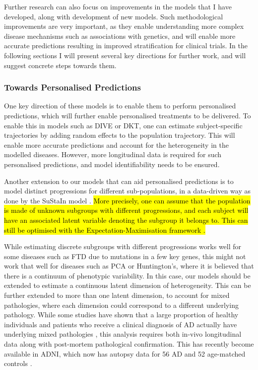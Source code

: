 Further research can also focus on improvements in the models that I have developed, along with development of new models. Such methodological improvements are very important, as they enable understanding more complex disease mechanisms such as associations with genetics, and will enable more accurate predictions resulting in improved stratification for clinical trials. In the following sections I will present several key directions for further work, and will suggest concrete steps towards them.

\subsubsection{Towards Personalised Predictions}
\label{sec:conMetPer}
One key direction of these models is to enable them to perform personalised predictions, which will further enable personalised treatments to be delivered. To enable this in models such as DIVE or DKT, one can estimate subject-specific trajectories by adding random effects to the population trajectory. This will enable more accurate predictions and account for the heterogeneity in the modelled diseases. However, more longitudinal data is required for such personalised predictions, and model identifiability needs to be ensured.

Another extension to our models that can aid personalised predictions is to model distinct progressions for different sub-populations, in a data-driven way as done by the SuStaIn model \cite{young2018uncovering}. \hl{More precisely, one can assume that the population is made of unknown subgroups with different progressions, and each subject will have an associated latent variable denoting the subgroup it belongs to. This can still be optimised with the Expectation-Maximisation framework \cite{bishop2007pattern}.}

While estimating discrete subgroups with different progressions works well for some diseases such as FTD due to mutations in a few key genes, this might not work that well for diseases such as PCA or Huntington's, where it is believed that there is a continuum of phenotypic variability. In this case, our models should be extended to estimate a  continuous latent dimension of heterogeneity. This can be further extended to more than one latent dimension, to account for mixed pathologies, where each dimension could correspond to a different underlying pathology. While some studies have shown that a large proportion of healthy individuals and patients who receive a clinical diagnosis of AD actually have underlying mixed pathologies \cite{kovacs2013non, james2016tdp}, this analysis requires both in-vivo longitudinal data along with post-mortem pathological confirmation. This has recently become available in ADNI, which now has autopsy data for 56 AD and 52 age-matched controls \cite{trojanowski2010update}. 

